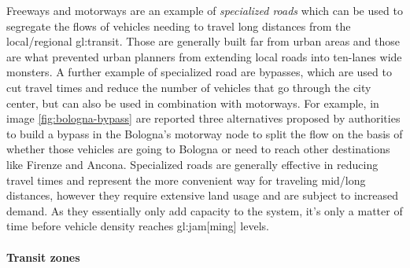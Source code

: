 Freeways and motorways are an example of \textit{specialized roads} which can be used to segregate the flows of vehicles needing to travel long distances from the local/regional \gls{gl:transit}. Those are generally built far from urban areas and those are what prevented urban planners from extending local roads into ten-lanes wide monsters. A further example of specialized road are bypasses, which are used to cut travel times and reduce the number of vehicles that go through the city center, but can also be used in combination with motorways. For example, in image \ref{fig:bologna-bypass} are reported three alternatives proposed by authorities to build a bypass in the Bologna's motorway node to split the flow on the basis of whether those vehicles are going to Bologna or need to reach other destinations like Firenze and Ancona. Specialized roads are generally effective in reducing travel times and represent the more convenient way for traveling mid/long distances, however they require extensive land usage and are subject to increased demand. As they essentially only add capacity to the system, it's only a matter of time before vehicle density reaches \gls{gl:jam}[ming] levels.


\paragraph{Transit zones}

